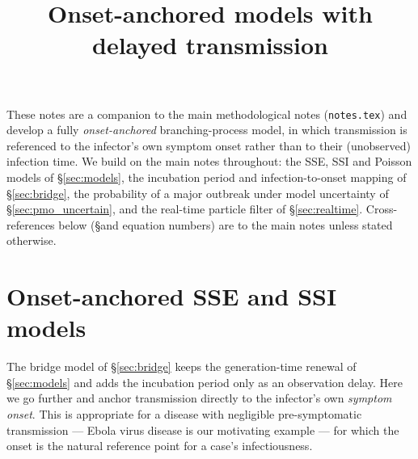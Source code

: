\documentclass{article}
\title{Onset-anchored models with delayed transmission}
\author{}
\date{}
\theoremstyle{definition}
\begin{document}
\maketitle

These notes are a companion to the main methodological notes
(\texttt{notes.tex}) and develop a fully \emph{onset-anchored} branching-process
model, in which transmission is referenced to the infector's own symptom onset
rather than to their (unobserved) infection time.  We build on the main notes
throughout: the SSE, SSI and Poisson models of \S\ref{sec:models}, the
incubation period and infection-to-onset mapping of \S\ref{sec:bridge}, the
probability of a major outbreak under model uncertainty of
\S\ref{sec:pmo_uncertain}, and the real-time particle filter of
\S\ref{sec:realtime}.  Cross-references below (\S and equation numbers) are to
the main notes unless stated otherwise.

\section{Onset-anchored SSE and SSI models}
\label{sec:onset_models}

The bridge model of \S\ref{sec:bridge} keeps the generation-time renewal of
\S\ref{sec:models} and adds the incubation period only as an observation delay.
Here we go further and anchor transmission directly to the infector's own
\emph{symptom onset}.  This is appropriate for a disease with negligible
pre-symptomatic transmission --- Ebola virus disease is our motivating example
--- for which the onset is the natural reference point for a case's
infectiousness.
\end{document}
